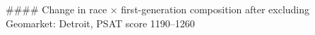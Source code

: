 #### Change in race × first-generation composition after excluding Geomarket: Detroit, PSAT score 1190–1260
